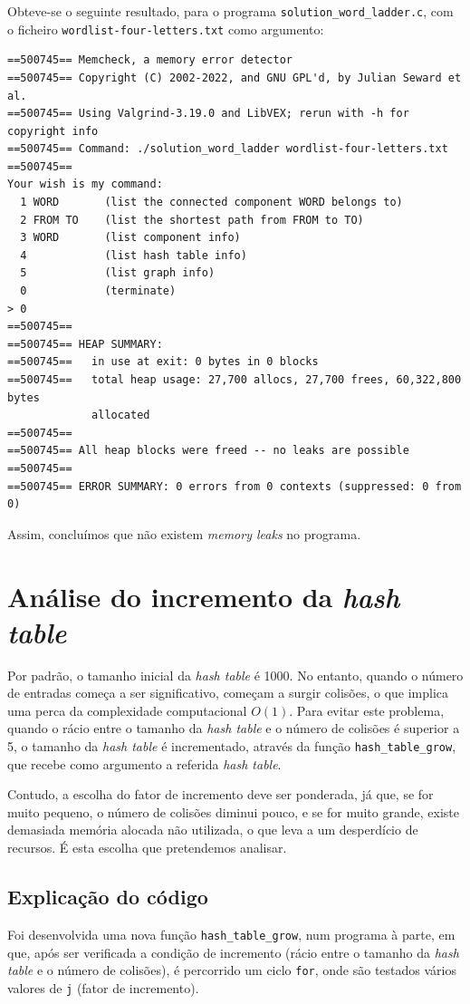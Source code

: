 \documentclass[portuguese,11pt,a4paper,titlepage]{article}
\begin{document}
Obteve-se o seguinte resultado, para o programa \verb|solution_word_ladder.c|, com o ficheiro \verb|wordlist-four-letters.txt| como argumento:

\begin{verbatim}
==500745== Memcheck, a memory error detector
==500745== Copyright (C) 2002-2022, and GNU GPL'd, by Julian Seward et al.
==500745== Using Valgrind-3.19.0 and LibVEX; rerun with -h for copyright info
==500745== Command: ./solution_word_ladder wordlist-four-letters.txt
==500745== 
Your wish is my command:
  1 WORD       (list the connected component WORD belongs to)
  2 FROM TO    (list the shortest path from FROM to TO)
  3 WORD       (list component info)
  4            (list hash table info)
  5            (list graph info)
  0            (terminate)
> 0
==500745== 
==500745== HEAP SUMMARY:
==500745==   in use at exit: 0 bytes in 0 blocks
==500745==   total heap usage: 27,700 allocs, 27,700 frees, 60,322,800 bytes
             allocated
==500745== 
==500745== All heap blocks were freed -- no leaks are possible
==500745== 
==500745== ERROR SUMMARY: 0 errors from 0 contexts (suppressed: 0 from 0)
\end{verbatim}

Assim, concluímos que não existem \textit{memory leaks} no programa. 

\pagebreak
\section{Análise do incremento da \textit{hash table}}
Por padrão, o tamanho inicial da \textit{hash table} é 1000. No entanto, quando o número de entradas começa a ser significativo, começam a surgir colisões, o que implica uma perca da complexidade computacional \begin{math}O(1)\end{math}. Para evitar este problema, quando o rácio entre o tamanho da \textit{hash table} e o número de colisões é superior a 5, o tamanho da \textit{hash table} é incrementado, através da função \verb|hash_table_grow|, que recebe como argumento a referida \textit{hash table}.

Contudo, a escolha do fator de incremento deve ser ponderada, já que, se for muito pequeno, o número de colisões diminui pouco, e se for muito grande, existe demasiada memória alocada não utilizada, o que leva a um desperdício de recursos. É esta escolha que pretendemos analisar.

\subsection{Explicação do código}
Foi desenvolvida uma nova função \verb|hash_table_grow|, num programa à parte, em que, após ser verificada a condição de incremento (rácio entre o tamanho da \textit{hash table} e o número de colisões), é percorrido um ciclo \verb|for|, onde são testados vários valores de \verb|j| (fator de incremento).
\end{document}
